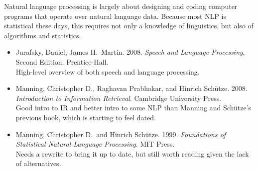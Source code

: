 
\noindent
Natural language processing is largely about designing and coding computer
programs that operate over natural language data.  Because most NLP is
statistical these days, this requires not only a knowledge of linguistics,
but also of algorithms and statistics.

\begin{itemize}
\item
Jurafsky, Daniel, James H.\ Martin.
2008.
{\it Speech and Language Processing}, Second Edition.
Prentice-Hall.
\\
{\footnotesize High-level overview of both speech and language
processing.}
%
\item
Manning, Christopher D., Raghavan Prabhakar, and Hinrich Sch\"utze.
2008.
{\it Introduction to Information Retrieval}.
Cambridge University Press.
\\
{\footnotesize Good intro to IR and better intro to some NLP than
Manning and Sch\"utze's previous book, which is starting to feel
dated.}
%
\item
Manning, Christopher D.\ and Hinrich Sch\"utze.
1999.
{\it Foundations of Statistical Natural Language Processing}.
MIT Press.
\\
{\footnotesize Needs a rewrite to bring it up to date, but still
worth reading given the lack of alternatives.}
\end{itemize}





